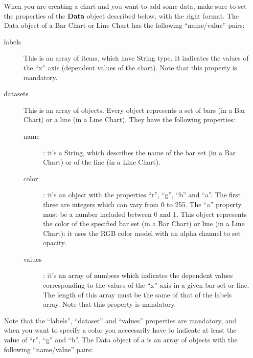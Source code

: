 			When you are creating a chart and you want to add some data, make sure to set the properties of the \textbf{Data} object described below, with the right format.
			 \label{sec:dataBarLine}
				The Data object of a Bar Chart or Line Chart has the following “name/value” pairs:
				\begin{description}
					\item[labels] This is an array of items, which have String type. It indicates the values of the “x” axis (dependent values of the chart). Note that this property is mandatory.
					\item[datasets] This is an array of objects. Every object represents a set of bars (in a Bar Chart) or a line (in a Line Chart). They have the following properties: 
					\begin{description}
						\item[name]: it's a String, which describes the name of the bar set (in a Bar Chart) or of the line (in a Line Chart). 
						\item[color]: it's an object with the properties “r”, “g”, “b” and “a”. The first three are integers which can vary from 0 to 255. The “a” property must be a number included between 0 and 1. This object represents the color of the specified bar set (in a Bar Chart) or line (in a Line Chart): it uses the RGB color model with an alpha channel to set opacity.
						\item[values]: it's an array of numbers which indicates the dependent values corresponding to the values of the “x” axis in a given bar set or line. The length of this array must be the same of that of the labels array. Note that this property is mandatory.
					\end{description}
				\end{description}
				Note that the “labels”, “dataset” and “values” properties are mandatory, and when you want to specify a color you neccesarily have to indicate at least the value of “r”, “g” and “b”.
				The Data object of a  is an array of objects with the following “name/value” pairs:
